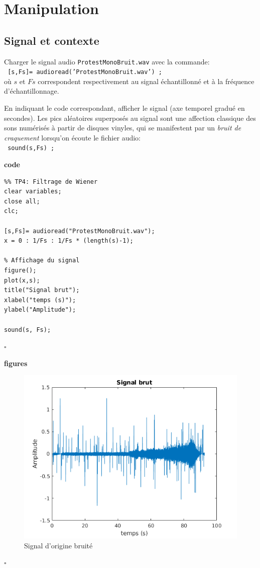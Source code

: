 \documentclass{article}
\newcommand{\debutrep}[1]{\color{blue}\begin{center} \hrulefill \textbf{ #1 } \hrulefill \end{center} }
\newcommand{\finrep}{\vspace*{5mm}\hfill $\square$\color{black}\vspace*{5mm}}
\begin{document}
\clearpage
\section{Manipulation}

\subsection{Signal et contexte}
Charger le signal audio {\tt ProtestMonoBruit.wav} avec la commande:\\[1mm]
{\tt
[s,Fs]= audioread('ProtestMonoBruit.wav') ;\\[1mm]
}
où $s$ et $Fs$ correspondent respectivement au signal échantillonné et à la fréquence d'échantillonnage.

En indiquant le code correspondant, afficher le signal (axe temporel gradué en secondes). Les pics aléatoires superposés au signal sont une affection classique des sons numérisés à partir de disques vinyles, qui se manifestent par un  \textit{bruit de craquement} lorsqu'on écoute le fichier audio:\\[1mm]
{\tt
sound(s,Fs) ;\\[2mm]
}

\debutrep{code}
\begin{verbatim}
%% TP4: Filtrage de Wiener
clear variables;
close all;
clc;

[s,Fs]= audioread("ProtestMonoBruit.wav");
x = 0 : 1/Fs : 1/Fs * (length(s)-1);

% Affichage du signal
figure();
plot(x,s);
title("Signal brut");
xlabel("temps (s)");
ylabel("Amplitude");

sound(s, Fs);
\end{verbatim}
\finrep

\debutrep{figures}
\begin{figure}[H]
    \includegraphics[width=\columnwidth]{signal.png}
    \caption{Signal d'origine bruité}
\end{figure}
\finrep
\end{document}

